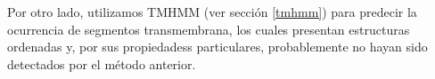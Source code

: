 
Por otro lado, utilizamos TMHMM (ver sección \ref{tmhmm}) para predecir la ocurrencia de segmentos transmembrana, 
los cuales presentan estructuras ordenadas y, por sus propiedadess particulares, probablemente no hayan sido detectados por el método anterior.






